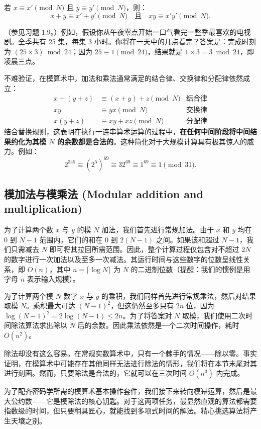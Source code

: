 \begin{property}
若 $x \equiv x' \pmod N$ 且 $y \equiv y' \pmod N$，则：
\[
x + y \equiv x' + y' \pmod N \quad \text{且} \quad xy \equiv x'y' \pmod N.
\]
\end{property}
（参见习题 1.9。）例如，假设你从午夜零点开始一口气看完一整季最喜欢的电视剧。全季共有 25 集，每集 3 小时。你将在一天中的几点看完？答案是：完成时刻为 $(25 \times 3) \bmod 24$；因为 $25 \equiv 1 \pmod{24}$，结果就是 $1 \times 3 = 3 \bmod 24$，即凌晨三点。

不难验证，在模算术中，加法和乘法通常满足的结合律、交换律和分配律依然成立：
\begin{align*}
x + (y + z) &\equiv (x + y) + z \pmod N & \text{结合律} \\
xy &\equiv yx \pmod N & \text{交换律} \\
x(y + z) &\equiv xy + xz \pmod N & \text{分配律}
\end{align*}
结合替换规则，这表明在执行一连串算术运算的过程中，\textbf{在任何中间阶段将中间结果约化为其模 $N$ 的余数都是合法的}。这种简化对于大规模计算具有极其惊人的威力。例如：
\[
2^{345} \equiv (2^5)^{69} \equiv 32^{69} \equiv 1^{69} \equiv 1 \pmod{31}.
\]

\subsection{模加法与模乘法 (Modular addition and multiplication)}
为了计算两个数 $x$ 与 $y$ 的模 $N$ 加法，我们首先进行常规加法。由于 $x$ 和 $y$ 均在 $0$ 到 $N-1$ 范围内，它们的和在 $0$ 到 $2(N-1)$ 之间。如果该和超过 $N-1$，我们只需减去 $N$ 即可将其拉回所需范围。因此，整个计算过程仅包含对不超过 $2N$ 的数字进行一次加法以及至多一次减法。其运行时间与这些数字的位数呈线性关系，即 $O(n)$，其中 $n = \lceil \log N \rceil$ 为 $N$ 的二进制位数（提醒：我们的惯例是用字母 $n$ 表示输入规模）。

为了计算两个模 $N$ 数字 $x$ 与 $y$ 的乘积，我们同样首先进行常规乘法，然后对结果取模 $N$。乘积最大可达 $(N-1)^2$，但这仍然至多只有 $2n$ 位，因为 $\log(N-1)^2 = 2\log(N-1) \le 2n$。为了将答案对 $N$ 取模，我们使用二次时间除法算法求出除以 $N$ 后的余数。因此乘法依然是一个二次时间操作，耗时 $O(n^2)$。

除法却没有这么容易。在常规实数算术中，只有一个棘手的情况——除以零。事实证明，在模算术中可能存在其他同样无法进行除法的情形，我们将在本节末尾对其进行刻画。然而，只要除法是合法的，它就可以在三次时间 $O(n^3)$ 内完成。

为了配齐密码学所需的模算术基本操作套件，我们接下来转向模幂运算，然后是最大公约数——它是模除法的核心钥匙。对于这两项任务，最显然直观的算法都需要指数级的时间，但只要稍具匠心，就能找到多项式时间的解法。精心挑选算法将产生天壤之别。

